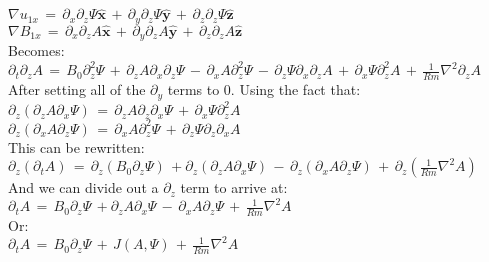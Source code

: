 \documentclass[letterpaper,12pt]{article}
\newcommand\reym{\mathrel{Rm}}
\begin{document}
$\nabla u_{1x}  \, = \, \partial_x \partial_z \Psi \mathbf{\hat{x}} \, + \, \partial_y \partial_z \Psi \mathbf{\hat{y}} \, + \, \partial_z \partial_z \Psi \mathbf{\hat{z}}$ \\

$\nabla B_{1x} \, = \, \partial_x \partial_z A \mathbf{\hat{x}} \, + \, \partial_y\partial_z A \mathbf{\hat{y}} \, + \, \partial_z \partial_z A \mathbf{\hat{z}}$ \\

Becomes: \\

$\partial_t \partial_z A \, = \, B_0 \partial_z^2 \Psi \, + \, \partial_z A \partial_x \partial_z \Psi \, - \, \partial_x A \partial_z^2 \Psi \, - \, \partial_z \Psi \partial_x \partial_z A \, + \, \partial_x \Psi \partial_z^2 A \, + \, \frac{1}{\reym} \nabla^2 \partial_z A$ \\

After setting all of the $\partial_y$ terms to 0. Using the fact that: \\

$\partial_z\left(\partial_z A \partial_x \Psi\right) \, = \, \partial_z A \partial_z \partial_x \Psi \, + \, \partial_x \Psi \partial_z^2 A$ \\

$\partial_z\left(\partial_x A \partial_z \Psi\right) \, = \, \partial_x A \partial_z^2 \Psi \, + \, \partial_z \Psi \partial_z \partial_x A$ \\

This can be rewritten: \\

$\partial_z \left(\partial_t A \right) \, = \, \partial_z \left(B_0 \partial_z \Psi \right) \, + \partial_z \left(\partial_z A \partial_x \Psi\right) \, - \, \partial_z\left(\partial_x A \partial_z \Psi \right) \, + \, \partial_z \left(\frac{1}{Rm} \nabla^2 A\right)$ \\

And we can divide out a $\partial_z$ term to arrive at: \\

$\partial_t A \, = \, B_0 \partial_z \Psi \, + \partial_z A \partial_x \Psi \, - \, \partial_x A \partial_z \Psi \, + \, \frac{1}{Rm} \nabla^2 A$ \\

Or: \\

$\partial_t A \, = \, B_0 \partial_z \Psi \, + \, J\left(A, \Psi\right) \, + \, \frac{1}{Rm} \nabla^2 A$ \\
\end{document}
